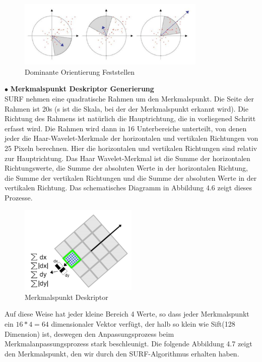 \begin{figure}[htb]
 \centering 
 \includegraphics[keepaspectratio,width=0.8\textwidth]{images/4_ZweiteErfahrung/Dominante_Orientierung_Feststellen.pdf}
 \caption{Dominante Orientierung Feststellen}
 \label{fig:Dominante Orientierung Feststellen}
\end{figure} 


$\bullet$ \textbf{Merkmalspunkt Deskriptor Generierung}\\
SURF nehmen eine quadratische Rahmen um den Merkmalspunkt. Die Seite der Rahmen ist 20s (s ist die Skala, bei der der Merkmalspunkt erkannt wird). Die Richtung des Rahmens ist natürlich die Hauptrichtung, die in vorliegened Schritt erfasst wird. Die Rahmen wird dann in 16 Unterbereiche unterteilt, von denen jeder die Haar-Wavelet-Merkmale der horizontalen und vertikalen Richtungen von 25 Pixeln berechnen. Hier die horizontalen und vertikalen Richtungen sind relativ zur Hauptrichtung. Das Haar Wavelet-Merkmal ist die Summe der horizontalen Richtungswerte, die Summe der absoluten Werte in der horizontalen Richtung, die Summe der vertikalen Richtungen und die Summe der absoluten Werte in der vertikalen Richtung. Das schematisches Diagramm in Abbildung 4.6 zeigt dieses Prozesse.

\begin{figure}[htb]
 \centering 
 \includegraphics[keepaspectratio,width=0.5\textwidth]{images/4_ZweiteErfahrung/Merkmalspunkt_Deskriptor.pdf}
 \caption{Merkmalspunkt Deskriptor}
 \label{fig:Merkmalspunkt Deskriptor}
\end{figure} 

Auf diese Weise hat jeder kleine Bereich 4 Werte, so dass jeder Merkmalspunkt ein $16*4=64$ dimensionaler Vektor verfügt, der halb so klein wie Sift(128 Dimension) ist, deswegen den Anpassungsprozess beim Merkmalanpassungsprozess stark beschleunigt. Die folgende Abbildung 4.7 zeigt den Merkmalspunkt, den wir durch den SURF-Algorithmus erhalten haben.


